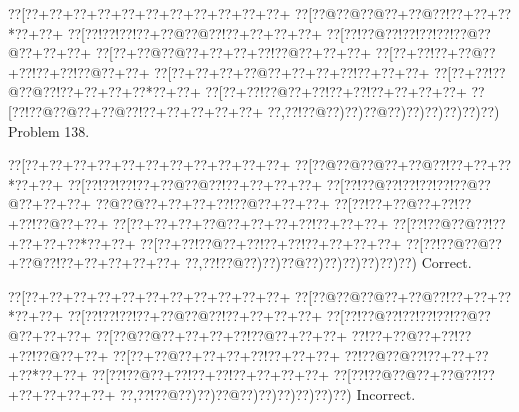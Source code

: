 \documentclass[a5paper]{article}
\begin{document}
\newpage
\begin{center}
{\goo
\0??[\0??+\0??+\0??+\0??+\0??+\0??+\0??+\0??+\0??+\0??+\0??+
\0??[\0??@\0??@\0??@\0??+\0??@\0??!\0??+\0??+\0??*\0??+\0??+
\0??[\0??!\0??!\0??!\0??+\0??@\0??@\0??!\0??+\0??+\0??+\0??+
\0??[\0??!\0??@\0??!\0??!\0??!\0??!\0??@\0??@\0??+\0??+\0??+
\0??[\0??+\0??@\0??@\0??+\0??+\0??+\0??!\0??@\0??+\0??+\0??+
\0??[\0??+\0??!\0??+\0??@\0??+\0??!\0??+\0??!\0??@\0??+\0??+
\0??[\0??+\0??+\0??+\0??@\0??+\0??+\0??+\0??!\0??+\0??+\0??+
\0??[\0??+\0??!\0??@\0??@\0??!\0??+\0??+\0??+\0??*\0??+\0??+
\0??[\0??+\0??!\0??@\0??+\0??!\0??+\0??!\0??+\0??+\0??+\0??+
\0??[\0??!\0??@\0??@\0??+\0??@\0??!\0??+\0??+\0??+\0??+\0??+
\0??,\0??!\0??@\0??)\0??)\0??@\0??)\0??)\0??)\0??)\0??)\0??)
}
Problem 138.

\end{center}
\begin{center}
{\goo
\0??[\0??+\0??+\0??+\0??+\0??+\0??+\0??+\0??+\0??+\0??+\0??+
\0??[\0??@\0??@\0??@\0??+\0??@\0??!\0??+\0??+\0??*\0??+\0??+
\0??[\0??!\0??!\0??!\0??+\0??@\0??@\0??!\0??+\0??+\0??+\0??+
\0??[\0??!\0??@\0??!\0??!\0??!\0??!\0??@\0??@\0??+\0??+\0??+
\0??@\0??@\0??+\0??+\0??+\0??!\0??@\0??+\0??+\0??+
\0??[\0??!\0??+\0??@\0??+\0??!\0??+\0??!\0??@\0??+\0??+
\0??[\0??+\0??+\0??+\0??@\0??+\0??+\0??+\0??!\0??+\0??+\0??+
\0??[\0??!\0??@\0??@\0??!\0??+\0??+\0??+\0??*\0??+\0??+
\0??[\0??+\0??!\0??@\0??+\0??!\0??+\0??!\0??+\0??+\0??+\0??+
\0??[\0??!\0??@\0??@\0??+\0??@\0??!\0??+\0??+\0??+\0??+\0??+
\0??,\0??!\0??@\0??)\0??)\0??@\0??)\0??)\0??)\0??)\0??)\0??)
}
Correct. 

\end{center}
\begin{center}
{\goo
\0??[\0??+\0??+\0??+\0??+\0??+\0??+\0??+\0??+\0??+\0??+\0??+
\0??[\0??@\0??@\0??@\0??+\0??@\0??!\0??+\0??+\0??*\0??+\0??+
\0??[\0??!\0??!\0??!\0??+\0??@\0??@\0??!\0??+\0??+\0??+\0??+
\0??[\0??!\0??@\0??!\0??!\0??!\0??!\0??@\0??@\0??+\0??+\0??+
\0??[\0??@\0??@\0??+\0??+\0??+\0??!\0??@\0??+\0??+\0??+
\0??!\0??+\0??@\0??+\0??!\0??+\0??!\0??@\0??+\0??+
\0??[\0??+\0??@\0??+\0??+\0??+\0??!\0??+\0??+\0??+
\0??!\0??@\0??@\0??!\0??+\0??+\0??+\0??*\0??+\0??+
\0??[\0??!\0??@\0??+\0??!\0??+\0??!\0??+\0??+\0??+\0??+
\0??[\0??!\0??@\0??@\0??+\0??@\0??!\0??+\0??+\0??+\0??+\0??+
\0??,\0??!\0??@\0??)\0??)\0??@\0??)\0??)\0??)\0??)\0??)\0??)
}
Incorrect. 

\end{center}
\end{document}
